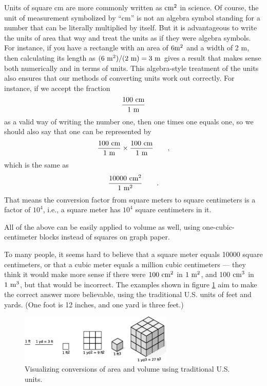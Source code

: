 Units of square cm are more commonly written as $\textup{cm}^2$ in
science. Of course, the unit of measurement symbolized by
``cm'' is not an algebra symbol standing for a number that
can be literally multiplied by itself. But it is advantageous
to write the units of area that way and treat the units as
if they were algebra symbols. For instance, if you have a
rectangle with an area of $6 \textup{m}^2$ and a width of 2 m, then
calculating its length as $(6\ \munit^2)/(2\ \munit)=3\ \munit$ gives a result
that makes sense both numerically and in terms of units.
This algebra-style treatment of the units also ensures that
our methods of converting units work out correctly. For
instance, if we accept the fraction
\begin{equation*}
 \frac{100\ \textup{cm}}{1\ \textup{m}}
\end{equation*}
as a valid way of writing the number one, then one times one
equals one, so we should also say that one can be represented by
\begin{equation*}
 \frac{100\ \zu{cm}}{1\ \munit} \times \frac{100\ \zu{cm}}{1\ \munit} \qquad ,
\end{equation*}
which is the same as
\begin{equation*}
 \frac{10000\ \textup{cm}^2}{1\ \textup{m}^2} \qquad .
\end{equation*}
That means the conversion factor from square meters to
square centimeters is a factor of $10^4$, i.e., a square
meter has $10^4$ square centimeters in it.

All of the above can be easily applied to volume as well,
using one-cubic-centimeter blocks instead of squares on graph paper.

To many people, it seems hard to believe that a square meter
equals 10000 square centimeters, or that a cubic meter
equals a million cubic centimeters --- they think it would
make more sense if there were $100\ \textup{cm}^2$ in $1\ \textup{m}^2$, and 100
$\textup{cm}^3$ in $1\ \munit^3$, but that would be incorrect. The examples
shown in figure \ref{yd2-yd3} aim to make the correct answer
more believable, using the traditional U.S. units of feet
and yards. (One foot is 12 inches, and one yard is three feet.)

\begin{figure}
\centering
\includegraphics[width=0.65\textwidth]{./introduction/figs/yd2-yd3}
\caption{ \qquad Visualizing conversions of area and volume using traditional U.S. units.}
\label{yd2-yd3}
\end{figure}



